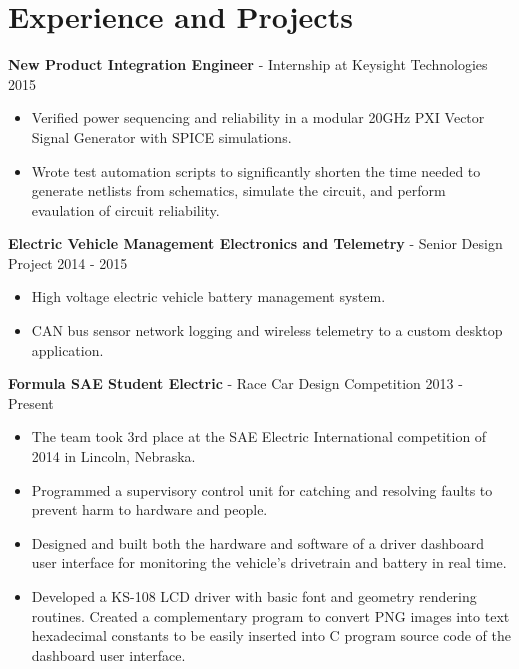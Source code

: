 \documentclass[10pt]{article}
\begin{document}
\section{Experience and Projects}
\begin{adjustwidth}{16pt}{0pt}

\noindent\textbf{New Product Integration Engineer} - Internship at Keysight Technologies
\hfill 2015
\begin{itemize}
	\setlength\itemsep{0pt}
	\item Verified power sequencing and reliability in a modular 20GHz
	PXI Vector Signal Generator with SPICE simulations.
	\item Wrote test automation scripts to significantly shorten the time needed
	to generate netlists from schematics, simulate the circuit, and perform
	evaulation of circuit reliability.
\end{itemize}


\vspace{8pt}
\noindent\textbf{Electric Vehicle Management Electronics and Telemetry} - Senior Design Project
\hfill 2014 - 2015
\begin{itemize}
	\setlength\itemsep{0pt}
	\item High voltage electric vehicle battery management system.
	\item CAN bus sensor network logging and wireless telemetry to a custom
	desktop application.
\end{itemize}



\vspace{8pt}
\noindent\textbf{Formula SAE Student Electric} - Race Car Design Competition
\hfill 2013 - Present
\begin{itemize}
	\setlength\itemsep{0pt}
	\item The team took 3rd place at the SAE Electric International competition of
	2014 in Lincoln, Nebraska.
	\item Programmed a supervisory control unit for catching and resolving faults
	to prevent harm to hardware and people.
	\item Designed and built both the hardware and software of a driver dashboard
	user interface for monitoring the vehicle's drivetrain and battery in real
	time.
	\item Developed a KS-108 LCD driver with basic font and geometry rendering
	routines. Created a complementary program to convert PNG images into text
	hexadecimal constants to be easily inserted into C program source code of the
	dashboard user interface.
\end{itemize}



\end{adjustwidth}
\end{document}
